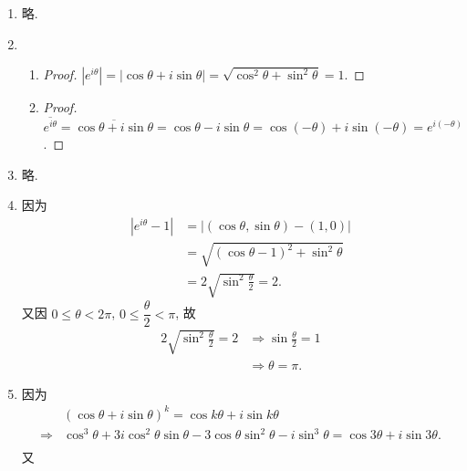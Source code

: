 % 
\begin{enumerate}
\item %
    略.
\item %
    \begin{enumerate}
        \item \begin{proof}
            $|e^{i\theta}| = |\cos\theta + i\sin\theta| = \sqrt{\cos^2\theta + \sin^2\theta} = 1$.
        \end{proof}
        \item \begin{proof}
            $\overline{e^{i\theta}} = \overline{\cos\theta + i\sin\theta} = \cos\theta - i\sin\theta = \cos(-\theta) + i\sin(-\theta) = e^{i(-\theta)}$.
        \end{proof}
    \end{enumerate}
\item %
    略.
\item %
    因为    
    \begin{align*}
        |e^{i\theta} - 1| &= |(\cos\theta, \sin\theta) - (1, 0)| \\
        &= \sqrt{(\cos\theta-1)^2 + \sin^2\theta} \\
        &= 2\sqrt{\sin^2\frac{\theta}{2}} = 2.
    \end{align*}
    又因 $0 \leqslant \theta < 2\pi$, $0 \leqslant \dfrac{\theta}{2} < \pi$, 故
    \begin{align*}
        2\sqrt{\sin^2\frac{\theta}{2}} = 2 &\Rightarrow \sin\frac{\theta}{2} = 1 \\
        &\Rightarrow \theta = \pi.   
    \end{align*}
\item %
    因为 \begin{align*}
        & (\cos\theta + i\sin\theta)^k = \cos{k\theta} + i\sin{k\theta} \\
        \Rightarrow{} & \cos^3\theta + 3i\cos^2\theta\sin\theta - 3\cos\theta\sin^2\theta - i\sin^3\theta = \cos{3\theta} + i\sin{3\theta}. \\
    \end{align*}
    又 \begin{align*}

\end{align*}
\end{enumerate}
